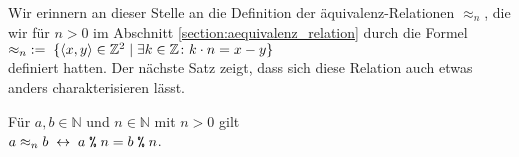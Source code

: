 \noindent
Wir erinnern an dieser Stelle an die Definition der \"{a}quivalenz-Relationen $\approx_n$, die wir f\"{u}r 
$n > 0$ im Abschnitt \ref{section:aequivalenz_relation} durch die Formel
\\[0.2cm]
\hspace*{1.3cm}
 $\approx_n \;:=\; \{ \pair(x,y) \in \mathbb{Z}^2 \mid \exists k \in \mathbb{Z} \colon k \cdot n = x - y \}$
\\[0.2cm]
definiert hatten.  Der n\"{a}chste Satz zeigt, dass sich diese Relation auch etwas anders charakterisieren
l\"{a}sst. 

\begin{Satz}
F\"{u}r $a,b \in \mathbb{N}$ und $n \in \mathbb{N}$ mit $n > 0$ gilt
\\[0.2cm]
\hspace*{1.3cm}
$a \approx_n b \;\leftrightarrow\; a \;\texttt{\%}\; n = b \;\texttt{\%}\; n$.
\end{Satz}
  
